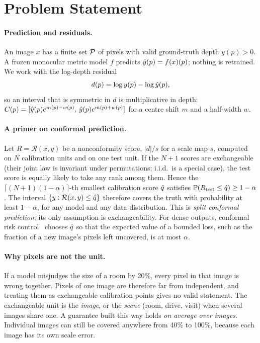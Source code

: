 \section{Problem Statement}
\label{sec:problem}

\paragraph{Prediction and residuals.}
An image $x$ has a finite set $\mathcal{P}$ of pixels with valid ground-truth depth $y(p)>0$.
A frozen monocular metric model $f$ predicts $\hat{y}(p)=f(x)(p)$; nothing is retrained.
We work with the log-depth residual
\begin{equation}
d(p)=\log y(p)-\log\hat{y}(p),
\label{eq:residual}
\end{equation}
so an interval that is symmetric in $d$ is multiplicative in depth: $C(p)=[\hat{y}(p)e^{m(p)-w(p)},\,\hat{y}(p)e^{m(p)+w(p)}]$ for a centre shift $m$ and a half-width $w$.

\paragraph{A primer on conformal prediction.}
Let $R=\mathcal{R}(x,y)$ be a nonconformity score, \eg $|d|/s$ for a scale map $s$, computed on $N$ calibration units and on one test unit.
If the $N+1$ scores are exchangeable (their joint law is invariant under permutations; i.i.d.\ is a special case), the test score is equally likely to take any rank among them.
Hence the $\lceil(N+1)(1-\alpha)\rceil$-th smallest calibration score $\hat{q}$ satisfies $\mathbb{P}(R_{\text{test}}\le\hat{q})\ge1-\alpha$.
The interval $\{y:\mathcal{R}(x,y)\le\hat{q}\}$ therefore covers the truth with probability at least $1-\alpha$, for any model and any data distribution.
This is \emph{split conformal prediction}; its only assumption is exchangeability.
For dense outputs, conformal risk control~\cite{angelopoulos2024crc} chooses $\hat{q}$ so that the expected value of a bounded loss, such as the fraction of a new image's pixels left uncovered, is at most $\alpha$.

\paragraph{Why pixels are not the unit.}
If a model misjudges the size of a room by 20\%, every pixel in that image is wrong together.
Pixels of one image are therefore far from independent, and treating them as exchangeable calibration points gives no valid statement.
The exchangeable unit is the \emph{image}, or the \emph{scene} (room, drive, visit) when several images share one.
A guarantee built this way holds \emph{on average over images}.
Individual images can still be covered anywhere from 40\% to 100\%, because each image has its own scale error.

